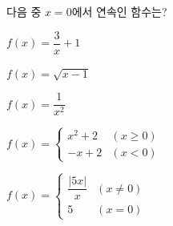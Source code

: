 다음 중 $x=0$에서 연속인 함수는?
\begin{choicesii}{\rule[-3ex]{0pt}{8ex}$f(x)=\dfrac{3}{x}+1$}{\rule[-3ex]{0pt}{8ex}$f(x)=\sqrt{x-1}$}{\rule[-3ex]{0pt}{8ex}$f(x)=\dfrac{1}{x^2}$}{\rule[-3ex]{0pt}{8ex}$f(x)=\begin{cases} x^2+2 & (x\ge 0) \\ -x+2 & (x<0) \end{cases}$}{\rule[-3ex]{0pt}{8ex}$f(x)=\begin{cases} \dfrac{|5x|}{x} & (x\ne 0) \\ 5 & (x=0) \end{cases}$}\end{choicesii}
